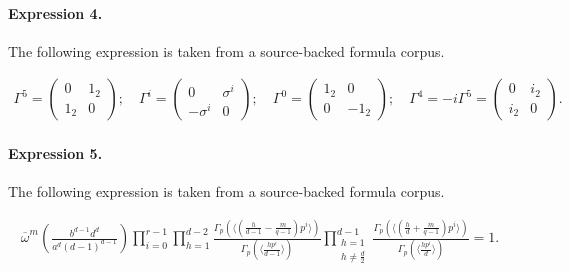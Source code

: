 \documentclass[11pt]{article}
\begin{document}
\paragraph{Expression 4.} The following expression is taken from a source-backed formula corpus.

\begin{align*}\Gamma ^{5}=\left( \begin{array}{cc}0 & 1_{2} \\ 1_{2} & 0\end{array}\right);\quad \Gamma ^{i}=\left( \begin{array}{cc}0 & \sigma ^{i} \\ -\sigma ^{i} & 0\end{array}\right);\quad \Gamma ^{0}=\left( \begin{array}{cc}1_{2} & 0 \\ 0 & -1_{2}\end{array}\right);\quad \Gamma ^{4}=-i\Gamma ^{5}=\left( \begin{array}{cc}0 & i_{2} \\ i_{2} & 0\end{array}\right).\end{align*}

\paragraph{Expression 5.} The following expression is taken from a source-backed formula corpus.

\begin{align*}\overline{\omega}^m\left(\frac{b^{d-1}d^d}{a^d(d-1)^{d-1}}\right)\prod_{i=0}^{r-1}\prod_{h=1}^{d-2}\frac{\Gamma_p(\langle(\frac{h}{d-1}-\frac{m}{q-1})p^i\rangle)}{\Gamma_p(\langle\frac{hp^i}{d-1}\rangle)}\prod_{\substack{h=1\\h\neq\frac{d}{2}}}^{d-1}\frac{\Gamma_p(\langle(\frac{h}{d}+\frac{m}{q-1})p^i\rangle)}{\Gamma_p(\langle\frac{hp^i}{d}\rangle)}=1.\end{align*}
\end{document}
